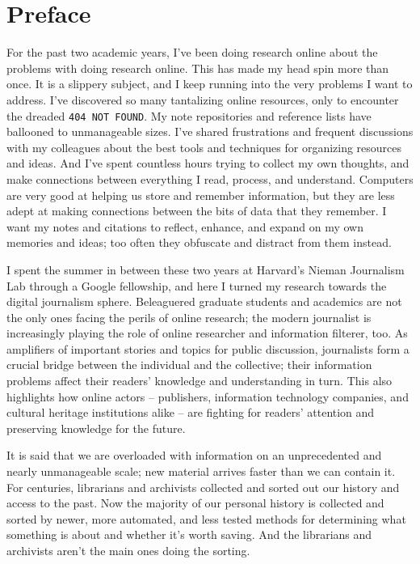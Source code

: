 \section{Preface}


For the past two academic years, I've been doing research online about the problems with doing research online. This has made my head spin more than once. It is a slippery subject, and I keep running into the very problems I want to address. I've discovered so many tantalizing online resources, only to encounter the dreaded \texttt{404 NOT FOUND}. My note repositories and reference lists have ballooned to unmanageable sizes. I've shared frustrations and frequent discussions with my colleagues about the best tools and techniques for organizing resources and ideas. And I've spent countless hours trying to collect my own thoughts, and make connections between everything I read, process, and understand. Computers are very good at helping us store and remember information, but they are less adept at making connections between the bits of data that they remember. I want my notes and citations to reflect, enhance, and expand on my own memories and ideas; too often they obfuscate and distract from them instead.

I spent the summer in between these two years at Harvard's Nieman Journalism Lab through a Google fellowship, and here I turned my research towards the digital journalism sphere. Beleaguered graduate students and academics are not the only ones facing the perils of online research; the modern journalist is increasingly playing the role of online researcher and information filterer, too. As amplifiers of important stories and topics for public discussion, journalists form a crucial bridge between the individual and the collective; their information problems affect their readers' knowledge and understanding in turn. This also highlights how online actors -- publishers, information technology companies, and cultural heritage institutions alike -- are fighting for readers' attention and preserving knowledge for the future.

It is said that we are overloaded with information on an unprecedented and nearly unmanageable scale; new material arrives faster than we can contain it. For centuries, librarians and archivists collected and sorted out our history and access to the past. Now the majority of our personal history is collected and sorted by newer, more automated, and less tested methods for determining what something is about and whether it's worth saving. And the librarians and archivists aren't the main ones doing the sorting.

